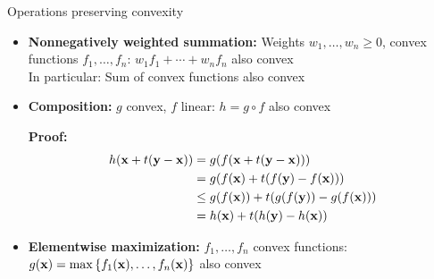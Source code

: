 \documentclass[11pt,compress,t,notes=noshow, xcolor=table]{beamer}
\begin{document}
\begin{vbframe}{Operations preserving convexity}

\begin{itemize}
    \item \textbf{Nonnegatively weighted summation:} Weights $w_1,\ldots,w_n\geq0$, convex functions $f_1,\ldots,f_n$:
        $w_1f_1 + \cdots + w_nf_n$ also convex \\
        In particular: Sum of convex functions also convex
    \item \textbf{Composition:} $g$ convex, $f$ linear: $h = g \circ f$ also convex
    
        \begin{footnotesize}
            \textbf{Proof:}
            \begin{align*}
                h(\mathbf{x} + t(\mathbf{y}-\mathbf{x})) &= g(f(\mathbf{x} + t(\mathbf{y}-\mathbf{x}))) \\
                &= g(f(\mathbf{x}) + t(f(\mathbf{y}) - f(\mathbf{x}))) \\
                &\leq g(f(\mathbf{x})) + t(g(f(\mathbf{y})) - g(f(\mathbf{x}))) \\
                &= h(\mathbf{x}) + t(h(\mathbf{y}) - h(\mathbf{x}))
            \end{align*}
        \end{footnotesize}
    \item \textbf{Elementwise maximization:} $f_1,\ldots,f_n$ convex functions: $g(\mathbf{x}) = \max\left\lbrace f_1(\mathbf{x}),\ldots,f_n(\mathbf{x}) \right\rbrace$ also convex
\end{itemize}
    
\end{vbframe}
\end{document}
